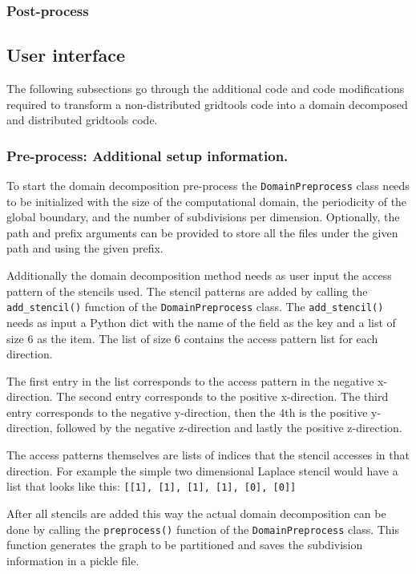 \subsubsection{Post-process}

\newpage
\subsection{User interface}
The following subsections go through the additional code and code modifications required to transform a non-distributed gridtools code into a domain decomposed and distributed gridtools code.

\subsubsection{Pre-process: Additional setup information.}
To start the domain decomposition pre-process the \texttt{DomainPreprocess} class needs to be initialized with the size of the computational domain, the periodicity of the global boundary, and the number of subdivisions per dimension.
Optionally, the path and prefix arguments can be provided to store all the files under the given path and using the given prefix.

Additionally the domain decomposition method needs as user input the access pattern of the stencils used.
The stencil patterns are added by calling the \texttt{add\_stencil()} function of the \texttt{DomainPreprocess} class.
The \texttt{add\_stencil()} needs as input a Python dict with the name of the field as the key and a list of size 6 as the item.
The list of size 6 contains the access pattern list for each direction.

The first entry in the list corresponds to the access pattern in the negative x-direction.
The second entry corresponds to the positive x-direction.
The third entry corresponds to the negative y-direction, then the 4th is the positive y-direction, followed by the negative z-direction and lastly the positive z-direction.

The access patterns themselves are lists of indices that the stencil accesses in that direction.
For example the simple two dimensional Laplace stencil would have a list that looks like this: \texttt{[[1], [1], [1], [1], [0], [0]]}

After all stencils are added this way the actual domain decomposition can be done by calling the \texttt{preprocess()} function of the \texttt{DomainPreprocess} class.
This function generates the graph to be partitioned and saves the subdivision information in a pickle file.

